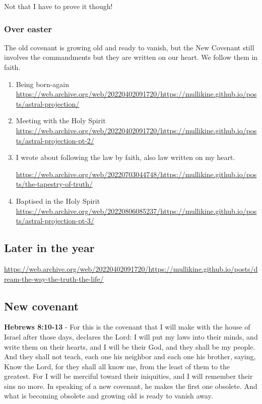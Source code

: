 \documentclass[11pt]{article}
\begin{document}
Not that I have to prove it though!

\subsubsection{Over easter}
\label{sec:orgc312f09}
The old covenant is growing old and ready to vanish, but the New Covenant still involves the commandments but they are written on our heart.
We follow them in faith.

\begin{enumerate}
\item Being born-again
\label{sec:org49602d6}
\url{https://web.archive.org/web/20220402091720/https://mullikine.github.io/posts/astral-projection/}

\item Meeting with the Holy Spirit
\label{sec:orgb80e273}
\url{https://web.archive.org/web/20220402091720/https://mullikine.github.io/posts/astral-projection-pt-2/}

\item I wrote about following the law by faith, also law written on my heart.
\label{sec:orge3ab24c}

\url{https://web.archive.org/web/20220703044748/https://mullikine.github.io/posts/the-tapestry-of-truth/}

\item Baptised in the Holy Spirit
\label{sec:org920047d}
\url{https://web.archive.org/web/20220806085237/https://mullikine.github.io/posts/astral-projection-pt-3/}
\end{enumerate}

\subsection{Later in the year}
\label{sec:org6b742a8}
\url{https://web.archive.org/web/20220402091720/https://mullikine.github.io/posts/dream-the-way-the-truth-the-life/}

\subsection{New covenant}
\label{sec:orgd4d395f}
\textbf{Hebrews 8:10-13} - For this is the covenant that I will make with the house of Israel after those days, declares the Lord: I will put my laws into their minds, and write them on their hearts, and I will be their God, and they shall be my people. And they shall not teach, each one his neighbor and each one his brother, saying, Know the Lord, for they shall all know me, from the least of them to the greatest. For I will be merciful toward their iniquities, and I will remember their sins no more. In speaking of a new covenant, he makes the first one obsolete. And what is becoming obsolete and growing old is ready to vanish away.
\end{document}
